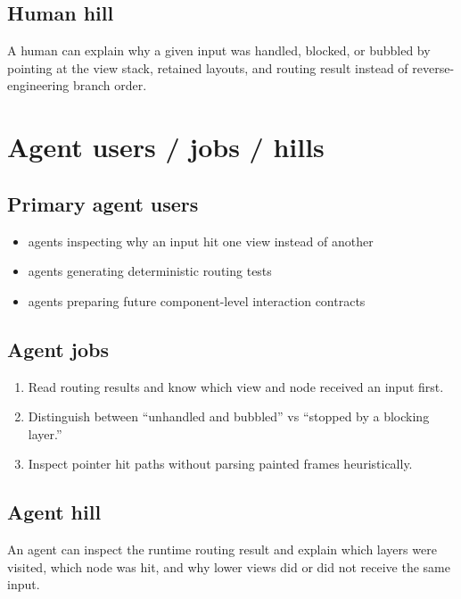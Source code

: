 \subsection{Human hill}\label{record-152-human-hill}

A human can explain why a given input was handled, blocked, or bubbled by pointing at the view stack, retained layouts, and routing result instead of reverse-engineering branch order.

\section{Agent users / jobs / hills}\label{record-152-agent-users-jobs-hills}

\subsection{Primary agent users}\label{record-152-primary-agent-users}

\begin{itemize}
\tightlist
\item
  agents inspecting why an input hit one view instead of another
\item
  agents generating deterministic routing tests
\item
  agents preparing future component-level interaction contracts
\end{itemize}

\subsection{Agent jobs}\label{record-152-agent-jobs}

\begin{enumerate}
\def\labelenumi{\arabic{enumi}.}
\tightlist
\item
  Read routing results and know which view and node received an input first.
\item
  Distinguish between ``unhandled and bubbled'' vs ``stopped by a blocking layer.''
\item
  Inspect pointer hit paths without parsing painted frames heuristically.
\end{enumerate}

\subsection{Agent hill}\label{record-152-agent-hill}

An agent can inspect the runtime routing result and explain which layers were visited, which node was hit, and why lower views did or did not receive the same input.

